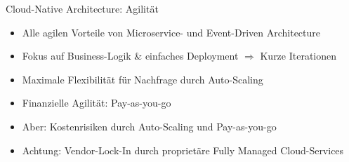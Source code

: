 \begin{frame}{Cloud-Native Architecture: Agilität}
    \begin{itemize}
        \item Alle agilen Vorteile von Microservice- und Event-Driven Architecture
        \item Fokus auf Business-Logik \& einfaches Deployment $\Rightarrow$ Kurze Iterationen
        \item Maximale Flexibilität für Nachfrage durch Auto-Scaling
        \item Finanzielle Agilität: Pay-as-you-go
        \item Aber: Kostenrisiken durch Auto-Scaling und Pay-as-you-go
        \item Achtung: Vendor-Lock-In durch proprietäre Fully Managed Cloud-Services
    \end{itemize}
\end{frame}